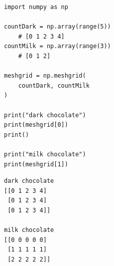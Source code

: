 
\begin{frame}[fragile]
%
\begin{tcbraster}[raster columns=2,
                  raster equal height,
                  nobeforeafter,
                  raster column skip=0.5cm]
\begin{codebox}
\begin{verbatim}
import numpy as np

countDark = np.array(range(5))
    # [0 1 2 3 4]
countMilk = np.array(range(3))
    # [0 1 2]
    
meshgrid = np.meshgrid(
    countDark, countMilk
)

print("dark chocolate")
print(meshgrid[0])
print()

print("milk chocolate")
print(meshgrid[1])
\end{verbatim}
\end{codebox}
%
\begin{cmdbox}
\begin{verbatim}
dark chocolate
[[0 1 2 3 4]
 [0 1 2 3 4]
 [0 1 2 3 4]]

milk chocolate
[[0 0 0 0 0]
 [1 1 1 1 1]
 [2 2 2 2 2]]
\end{verbatim}
\end{cmdbox}
\end{tcbraster}
%
\end{frame}


